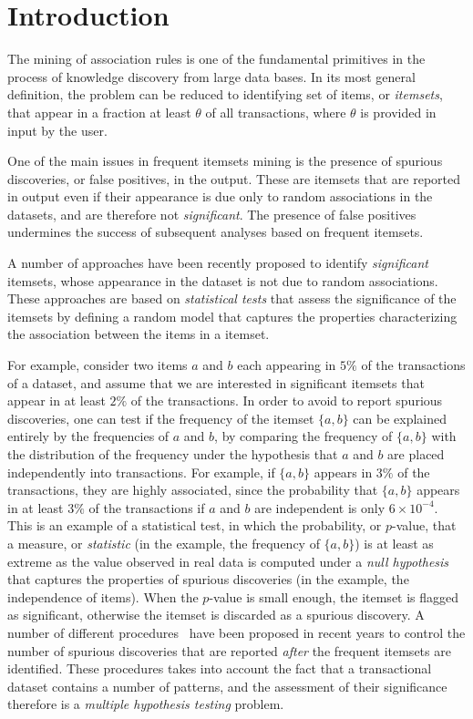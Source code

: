 \section{Introduction}\label{sec:intro}

The mining of association rules is one of the fundamental primitives in the process
 of knowledge discovery from large data bases. In its most general definition, the problem
 can be reduced to identifying set of items, or \emph{itemsets},
that appear in a fraction at least $\theta$ of all
 transactions, where $\theta$ is provided in input by the user.

One of the main issues in frequent itemsets mining is the presence of spurious
discoveries, or false positives, in the output. These are itemsets that are
reported in output even if their appearance is due only to random associations
in the datasets, and are therefore not \emph{significant}. The presence of false
positives undermines the success of subsequent analyses based on frequent
itemsets.

A number of approaches have been recently proposed to identify
\emph{significant} itemsets, whose appearance in the dataset is not due to
random associations.  These approaches are based on \emph{statistical tests}
that assess the significance of the itemsets by defining a random model that
captures the properties characterizing the association between the items in a
itemset.

For example, consider two items $a$ and $b$ each appearing in $5\%$ of the %
transactions of a dataset, and assume that we are interested in significant
itemsets that appear in at least $2\%$ of the transactions. In order to avoid to
report spurious discoveries, one can test if the frequency of the itemset $\{a,b\}$ can be
explained entirely by the frequencies of $a$ and $b$, by comparing the
frequency of $\{a,b\}$ with the distribution of the frequency under the
hypothesis that $a$ and $b$ are placed independently into transactions.  For
example, if $\{a,b\}$ appears in $3\%$ of the transactions, they are highly
associated, since the probability that $\{a,b\}$ appears in at least $3\%$ of
the transactions if $a$ and $b$ are independent is only $6\times 10^{-4}$. This
is an example of a statistical test, in which the probability, or $p$-value,
that a measure, or \emph{statistic} (in the example, the frequency of $\{a,b\}$)
is at least as extreme as the value observed in real data is computed under a
\emph{null hypothesis} that captures the properties of spurious discoveries (in
the example, the independence of items). When the $p$-value is small enough, the
itemset is flagged as significant, otherwise the itemset is discarded as a
spurious discovery. A number of different procedures~\citep{SilversteinBM98,MegiddoS98,DuMouchelP01,BoltonHA02,GionisMMT07,Hamalainen10,KirschMAPUV12} have been proposed
in recent years to control the number of spurious discoveries that are reported
\emph{after} the frequent itemsets are identified. These procedures takes into
account the fact that a transactional dataset contains a number of patterns, and
the assessment of their significance therefore is a \emph{multiple
hypothesis testing} problem.

